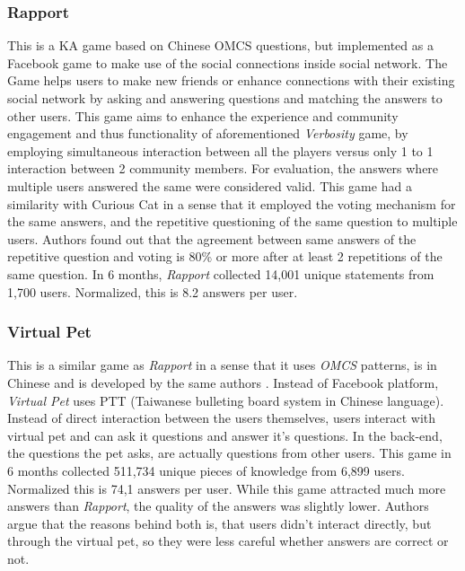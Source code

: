 \subsubsection{Rapport} 
This is a KA game based on Chinese OMCS questions, but implemented as a 
Facebook game to make use of the social connections inside social network. 
The Game helps users to make new friends or enhance connections with their 
existing social network by asking and answering questions and matching the 
answers to other users\parencite{Kuo2009}. This game aims to enhance the 
experience and community engagement and thus functionality of aforementioned 
\emph{Verbosity} game, by employing simultaneous  interaction between all the 
players versus only 1 to 1 interaction between 2 community members. For 
evaluation, the answers where multiple users answered the same were considered 
valid. This game had a similarity with Curious Cat in a sense that it employed
the voting mechanism for the same answers, and the repetitive questioning of
the same question to multiple users. Authors found out that the agreement 
between same answers of the repetitive question and voting is 80\% or more 
after at least 2 repetitions of the same question. In 6 months, \emph{Rapport}
collected 14,001 unique statements from 1,700 users. Normalized, this is
8.2 answers per user.

\subsubsection{Virtual Pet} 
This is a similar game as \emph{Rapport} in a sense that it
uses \emph{OMCS} patterns, is in Chinese and is developed by the same authors
\parencite{Kuo2009}. Instead of Facebook platform, \emph{Virtual Pet} uses
PTT (Taiwanese bulleting board system in Chinese language). Instead of direct
interaction between the users themselves, users interact with virtual pet and
can ask it questions and answer it's questions. In the back-end, the questions
the pet asks, are actually questions from other users. This game in 6 months 
collected 511,734 unique pieces of knowledge from 6,899 users. Normalized this
is 74,1 answers per user. While this game attracted much more answers than 
\emph{Rapport}, the quality of the answers was slightly lower. Authors
argue that the reasons behind both is, that users didn't interact directly,
but through the virtual pet, so they were less careful whether answers are
correct or not.

